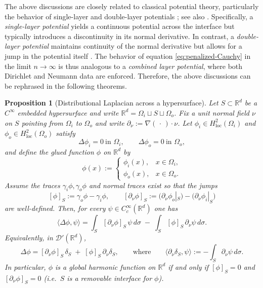 \documentclass[preprint,12pt]{elsarticle}
\theoremstyle{plain}
\newtheorem{proposition}[theorem]{Proposition}
\theoremstyle{definition}
\theoremstyle{note}
\newcommand{\R}{\mathbb{R}}
\begin{document}
The above discussions are closely related to classical potential theory, particularly the behavior of single-layer and double-layer potentials \cite{Kress2014, Ladyzhenskaya1985}; see also \cite{McLean2000}. Specifically, a \emph{single-layer potential} yields a continuous potential across the interface but typically introduces a discontinuity in its normal derivative. In contrast, a \emph{double-layer potential} maintains continuity of the normal derivative but allows for a jump in the potential itself \cite{ColtonKress1998}. The behavior of equation \eqref{eq:penalized-Cauchy} in the limit $n \to \infty$ is thus analogous to a \emph{combined layer potential}, where both Dirichlet and Neumann data are enforced. Therefore, the above discussions can be rephrased in the following theorems.

\begin{proposition}[Distributional Laplacian across a hypersurface]
\label{prop:distributional-Laplace-jumps}
Let $S\subset\R^d$ be a $C^\infty$ embedded hypersurface and write $\R^d=\Omega_i\sqcup S\sqcup\Omega_o$. Fix a unit normal field $\nu$ on $S$ pointing from $\Omega_i$ to $\Omega_o$ and write $\partial_\nu:=\nabla(\,\cdot\,)\cdot \nu$. Let $\phi_i\in H^2_{\mathrm{loc}}(\Omega_i)$ and $\phi_o\in H^2_{\mathrm{loc}}(\Omega_o)$ satisfy
\[
\Delta \phi_i=0\ \text{in }\Omega_i,\qquad \Delta\phi_o=0\ \text{in }\Omega_o,
\]
and define the glued function $\phi$ on $\R^d$ by
\[
\phi(x):=\begin{cases}
\phi_i(x),&x\in\Omega_i,\\
\phi_o(x),&x\in\Omega_o.
\end{cases}
\]
Assume the traces $\gamma_i\phi,\gamma_o\phi$ and normal traces exist so that the jumps
\[
[\phi]_S:=\gamma_o\phi-\gamma_i\phi,\qquad
[\partial_\nu\phi]_S:=\bigl(\partial_\nu\phi_o|_S\bigr)-\bigl(\partial_\nu\phi_i|_S\bigr)
\]
are well-defined. Then, for every $\psi\in C_c^\infty(\R^d)$ one has
\begin{equation}
\label{eq:distributional-Laplace-jumps}
\langle \Delta \phi,\psi\rangle= \int_S [\partial_\nu\phi]_S\,\psi\,d\sigma \;-\; \int_S [\phi]_S\,\partial_\nu\psi\,d\sigma .
\end{equation}
Equivalently, in $\mathcal D'(\R^d)$,
\[
\Delta\phi = [\partial_\nu\phi]_S\,\delta_S \;+\; [\phi]_S\,\partial_\nu\delta_S,
\qquad\text{where}\qquad \langle \partial_\nu\delta_S,\psi\rangle:=-\int_S \partial_\nu\psi\,d\sigma .
\]
In particular, $\phi$ is a global harmonic function on $\R^d$ if and only if $[\phi]_S=0$ and $[\partial_\nu\phi]_S=0$ (i.e.\ $S$ is a removable interface for $\phi$).
\end{proposition}
\end{document}
